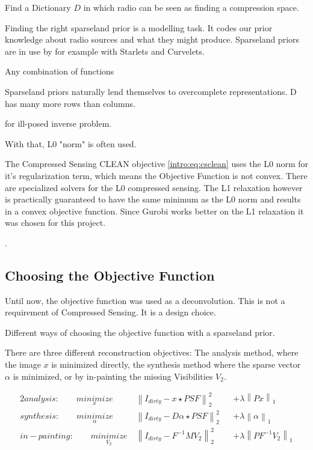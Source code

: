 Find a Dictionary $D$ in which radio can be seen as finding a compression space.


Finding the right sparseland prior is a modelling task. It codes our prior knowledge about radio sources and what they might produce. Sparseland priors are in use by for example with Starlets\cite{starck2015starlet} and Curvelets\cite{starck2003astronomical}. 

Any combination of functions

Sparseland priors naturally lend themselves to overcomplete representations. D has many more rows than columns.




for ill-posed inverse problem. 


With that, L0 "norm" is often used.

The Compressed Sensing CLEAN objective \eqref{intro:eq:csclean} uses the L0 norm for it's regularization term, which means the Objective Function is not convex. There are specialized solvers for the L0 compressed sensing. The L1 relaxation however is practically guaranteed to have the same minimum as the L0 norm and results in a convex objective function. Since Gurobi works better on the L1 relaxation it was chosen for this project.




.


\subsection{Choosing the Objective Function}
Until now, the objective function was used as a deconvolution. This is not a requirement of Compressed Sensing. It is a design choice.

Different ways of choosing the objective function with a sparseland prior.

There are three different reconstruction objectives: The analysis method, where the image $x$ is minimized directly, the synthesis method where the sparse vector $\alpha$ is minimized, or by in-painting the missing Visibilities $V_2$.

\begin{alignat*}{2}
analysis:\qquad \underset{x}{minimize} \:& \left \| I_{dirty} - x \star PSF \right \|_2^2 &&+  \lambda \left \| Px \right \|_1 \\
synthesis:\qquad \underset{\alpha}{minimize} \:& \left \| I_{dirty} - D \alpha \star PSF \right \|_2^2 &&+ \lambda \left \| \alpha \right \|_1 \\
in-painting:\qquad \underset{V_2}{minimize} \:& \left \|  I_{dirty} - F^{-1} M V_2 \right \|_2^2 &&+ \lambda \left \| PF^{-1}V_2\right \|_1
\end{alignat*}

